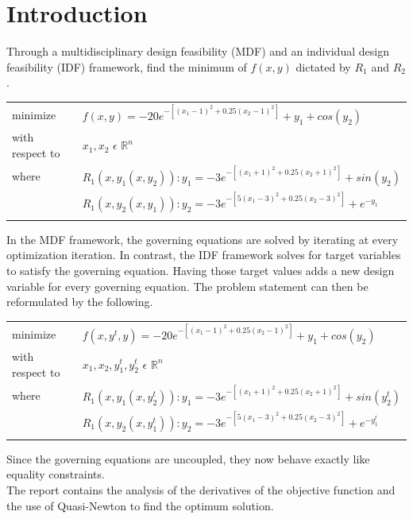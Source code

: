 \documentclass[letterpaper,12pt]{article}
\begin{document}
\maketitle

\section{Introduction}
Through a multidisciplinary design feasibility (MDF) and an individual design feasibility (IDF) framework, find the minimum of $f(x,y)$ dictated by $R_1$ and $R_2$.\\

\begin{tabular}{>{\hfill}p{4cm}p{11cm}}
  minimize & $f(x,y)=-20e^{-[(x_1-1)^2+0.25(x_2-1)^2]}+y_1+cos(y_2)$\\
  with respect to & $ x_1,x_2$  $  \epsilon$    $ \mathbb{R}^n$ \\
 where & $R_1(x,y_1(x,y_2)):y_1=-3e^{-[(x_1+1)^2+0.25(x_2+1)^2]}+sin(y_2)$\\
 &$R_1(x,y_2(x,y_1)):y_2=-3e^{-[5(x_1-3)^2+0.25(x_2-3)^2]}+e^{-y_1}$\\
  \multicolumn{2}{c}{} 
\end{tabular}


In the MDF framework, the governing equations are solved by iterating at every optimization iteration. In contrast, the IDF framework solves for target variables to satisfy the governing equation. Having those target values adds a new design variable for every governing equation. The problem statement can then be reformulated by the following.\\

\begin{tabular}{>{\hfill}p{4cm}p{11cm}}
  minimize & $f(x,y^t,y)=-20e^{-[(x_1-1)^2+0.25(x_2-1)^2]}+y_1+cos(y_2)$\\
  with respect to & $ x_1,x_2,y_1^t,y_2^t$  $  \epsilon$    $ \mathbb{R}^n$ \\
 where & $R_1(x,y_1(x,y_2^t)):y_1=-3e^{-[(x_1+1)^2+0.25(x_2+1)^2]}+sin(y_2^t)$\\
 &$R_1(x,y_2(x,y_1^t)):y_2=-3e^{-[5(x_1-3)^2+0.25(x_2-3)^2]}+e^{-y_1^t}$\\
  \multicolumn{2}{c}{} 
\end{tabular}

Since the governing equations are uncoupled, they now behave exactly like equality constraints.\\

The report contains the analysis of the derivatives of the objective function and the use of Quasi-Newton to find the optimum solution.\\
\end{document}
